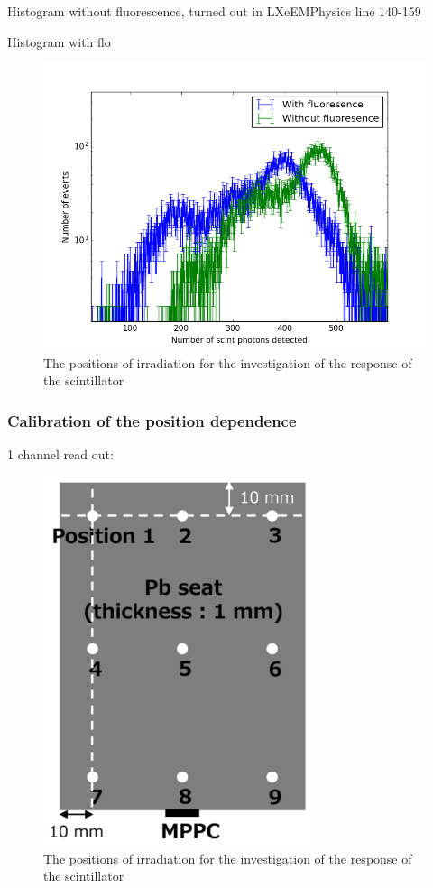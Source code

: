 \documentclass[12pt, a4paper,titlepage]{article}
\numberwithin{equation}{section}
\numberwithin{figure}{section}
\begin{document}
Histogram without fluorescence, turned out in LXeEMPhysics line 140-159

Histogram with flo

\begin{figure}
\centering
\includegraphics[width=140.0mm]{images/fluovsnofluo.png}
\caption{The positions of irradiation for the investigation of the response of the scintillator}
\end{figure}


\subsubsection{Calibration of the position dependence}



1 channel read out:

\begin{figure}
\centering
\includegraphics[width=80.0mm]{images/positions.png}
\caption{The positions of irradiation for the investigation of the response of the scintillator}
\end{figure}
\end{document}
